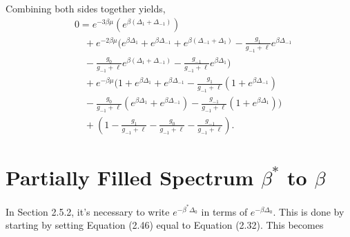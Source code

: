 Combining both sides together yields,
\begin{align}
    &0=e^{-3\beta\mu}(e^{\beta(\Delta_1+\Delta_{-1})})\nonumber\\
    &\quad+e^{-2\beta\mu}(e^{\beta\Delta_1}+e^{\beta\Delta_{-1}}+e^{\beta(\Delta_{-1}+\Delta_1)}-\frac{g_1}{g_{-1}+\ell}e^{\beta\Delta_{-1}}\nonumber\\
    &\quad-\frac{g_0}{g_{-1}+\ell}e^{\beta(\Delta_1+\Delta_{-1})}-\frac{g_{-1}}{g_{-1}+\ell}e^{\beta\Delta_1})\nonumber\\
    &\quad+e^{-\beta\mu}(1+e^{\beta\Delta_1}+e^{\beta\Delta_{-1}}-\frac{g_1}{g_{-1}+\ell}(1+e^{\beta\Delta_{-1}})\nonumber\\
    &\quad-\frac{g_0}{g_{-1}+\ell}(e^{\beta\Delta_1}+e^{\beta\Delta_{-1}})-\frac{g_{-1}}{g_{-1}+\ell}(1+e^{\beta\Delta_1}))\nonumber\\
    &\quad+(1-\frac{g_1}{g_{-1}+\ell}-\frac{g_0}{g_{-1}+\ell}-\frac{g_{-1}}{g_{-1}+\ell}).
\end{align}

\section{Partially Filled Spectrum $\beta^*$ to $\beta$}
In Section 2.5.2, it's necessary to write $e^{-\beta^*\Delta_0}$ in terms of $e^{-\beta\Delta_0}$. This is done by starting by setting Equation (2.46) equal to Equation (2.32). This becomes

